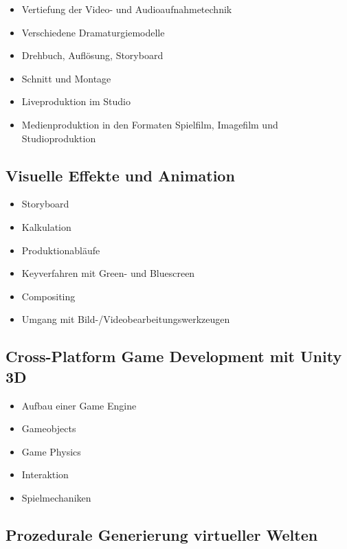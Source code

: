 \begin{itemize}
\item
  Vertiefung der Video- und Audioaufnahmetechnik
\item
  Verschiedene Dramaturgiemodelle
\item
  Drehbuch, Auflösung, Storyboard
\item
  Schnitt und Montage
\item
  Liveproduktion im Studio
\item
  Medienproduktion in den Formaten Spielfilm, Imagefilm und
  Studioproduktion
\end{itemize}

\subsection*{Visuelle Effekte und
Animation}\label{visuelle-effekte-und-animation-1}

\begin{itemize}
\item
  Storyboard
\item
  Kalkulation
\item
  Produktionabläufe
\item
  Keyverfahren mit Green- und Bluescreen
\item
  Compositing
\item
  Umgang mit Bild-/Videobearbeitungswerkzeugen
\end{itemize}

\subsection*{Cross-Platform Game Development mit Unity
3D}\label{cross-platform-game-development-mit-unity-3d-1}

\begin{itemize}
\item
  Aufbau einer Game Engine
\item
  Gameobjects
\item
  Game Physics
\item
  Interaktion
\item
  Spielmechaniken
\end{itemize}

\subsection*{Prozedurale Generierung virtueller
Welten}\label{prozedurale-generierung-virtueller-welten-1}

